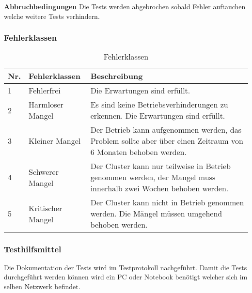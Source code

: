 \textbf{Abbruchbedingungen}\newline
Die Tests werden abgebrochen sobald Fehler auftauchen welche weitere Tests verhindern.

\subsubsection{Fehlerklassen}
\begin{table}[H]
\centering
\begin{tabular}{p{1cm}p{4cm}p{11cm}}
\hline
\rowcolor{heading} \textbf{Nr.} & \textbf{Fehlerklassen} & \textbf{Beschreibung} \\\hline
1 & Fehlerfrei & Die Erwartungen sind erfüllt.  \\\hline
2 & Harmloser Mangel & Es sind keine Betriebsverhinderungen zu erkennen. Die Erwartungen sind erfüllt. \\\hline
3 & Kleiner Mangel & Der Betrieb kann aufgenommen werden, das Problem sollte aber über einen Zeitraum von 6 Monaten behoben werden.  \\\hline
4 & Schwerer Mangel & Der Cluster kann nur teilweise in Betrieb genommen werden, der Mangel muss innerhalb zwei Wochen behoben werden. \\\hline
5 & Kritischer Mangel & Der Cluster kann nicht in Betrieb genommen werden. Die Mängel müssen umgehend behoben werden. \\\hline
\end{tabular}
\caption{Fehlerklassen}
\end{table}

\subsubsection{Testhilfsmittel}
Die Dokumentation der Tests wird im Testprotokoll nachgeführt. Damit die Tests durchgeführt werden können wird ein PC oder Notebook benötigt welcher sich im selben Netzwerk befindet.

